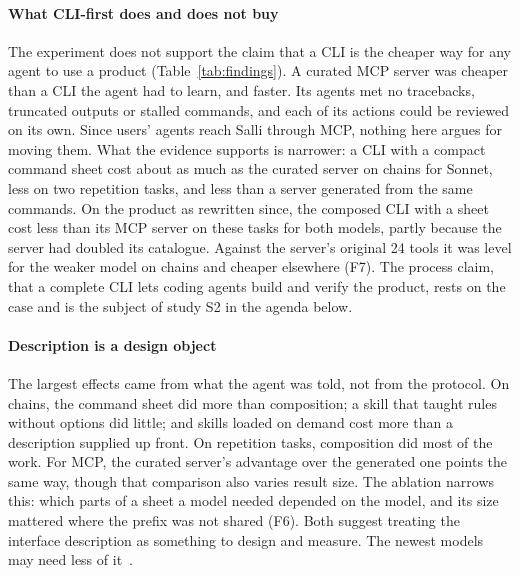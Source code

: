 \documentclass[sigconf,nonacm]{acmart}
\newcommand{\sysA}{Salli}
\begin{document}
\paragraph{What CLI-first does and does not buy}
The experiment does not support the claim that a CLI is the cheaper way for any agent to use a product (Table~\ref{tab:findings}). A curated MCP server was cheaper than a CLI the agent had to learn, and faster. Its agents met no tracebacks, truncated outputs or stalled commands, and each of its actions could be reviewed on its own. Since users' agents reach \sysA{} through MCP, nothing here argues for moving them. What the evidence supports is narrower: a CLI with a compact command sheet cost about as much as the curated server on chains for Sonnet, less on two repetition tasks, and less than a server generated from the same commands. On the product as rewritten since, the composed CLI with a sheet cost less than its MCP server on these tasks for both models, partly because the server had doubled its catalogue. Against the server's original 24 tools it was level for the weaker model on chains and cheaper elsewhere (F7). The process claim, that a complete CLI lets coding agents build and verify the product, rests on the case and is the subject of study S2 in the agenda below.

\paragraph{Description is a design object}
The largest effects came from what the agent was told, not from the protocol. On chains, the command sheet did more than composition; a skill that taught rules without options did little; and skills loaded on demand cost more than a description supplied up front. On repetition tasks, composition did most of the work. For MCP, the curated server's advantage over the generated one points the same way, though that comparison also varies result size. The ablation narrows this: which parts of a sheet a model needed depended on the model, and its size mattered where the prefix was not shared (F6). Both suggest treating the interface description as something to design and measure. The newest models may need less of it~\cite{hou2026scale}.
\end{document}
